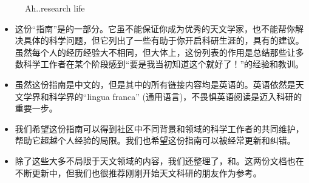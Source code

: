 \documentclass[letterpaper,10pt,english]{sphinxmanual}
\begin{document}
\begin{figure}[htbp]
\centering
\capstart

\noindent{}
\caption{Ah..research life}\label{\detokenize{resource/research/getting_started_cn:id23}}\end{figure}
\begin{itemize}
\item {} 
这份“指南”是的一部分。它虽不能保证你成为优秀的天文学家，也不能帮你解决具体的科学问题，但它列出了一些有助于你开启科研生涯的，具有的建议。虽然每个人的经历经验大不相同，但大体上，这份列表的作用是总结那些让多数科学工作者在某个阶段感到“要是我当初知道这个就好了！”的经验和教训。

\item {} 
虽然这份指南是中文的，但是其中的所有链接内容均是英语的。英语依然是天文学界和科学界的“lingua
franca” (通用语言)，不畏惧英语阅读是迈入科研的重要一步。

\item {} 
我们希望这份指南可以得到社区中不同背景和领域的科学工作者的共同维护，帮助它超越个人经验的局限。我们也希望这份指南可以被经常更新和纠错。

\item {} 
除了这些大多不局限于天文领域的内容，我们还整理了，和。这两份文档也在不断更新中，但我们也很推荐刚刚开始天文科研的朋友作为参考。

\end{itemize}
\end{document}
